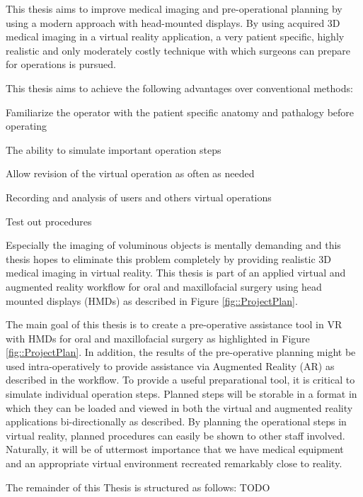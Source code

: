 This thesis aims to improve medical imaging and pre-operational planning by using a modern approach with head-mounted displays.
By using acquired 3D medical imaging in a virtual reality application, a very patient specific, highly realistic and only moderately costly technique with which surgeons can prepare for operations is pursued.

This thesis aims to achieve the following advantages over conventional methods:
\begin{compactenum}[label=(\alph*)]
    \item Familiarize the operator with the patient specific anatomy and pathalogy before operating
    \item The ability to simulate important operation steps
    \item Allow revision of the virtual operation as often as needed
    \item Recording and analysis of users and others virtual operations
    \item Test out procedures
\end{compactenum}

Especially the imaging of voluminous objects is mentally demanding and this thesis hopes to eliminate this problem completely by providing realistic 3D medical imaging in virtual reality.
This thesis is part of an applied virtual and augmented reality workflow for oral and maxillofacial surgery using head mounted displays (HMDs) as described in Figure \ref{fig::ProjectPlan}.

The main goal of this thesis is to create a pre-operative assistance tool in VR with HMDs for oral and maxillofacial surgery as highlighted in Figure \ref{fig::ProjectPlan}. 
In addition, the results of the pre-operative planning might be used intra-operatively to provide assistance via Augmented Reality (AR) as described in the workflow.
To provide a useful preparational tool, it is critical to simulate individual operation steps.
Planned steps will be storable in a format in which they can be loaded and viewed in both the virtual and augmented reality applications bi-directionally as described.
By planning the operational steps in virtual reality, planned procedures can easily be shown to other staff involved.
Naturally, it will be of uttermost importance that we have medical equipment and an appropriate virtual environment recreated remarkably close to reality.

The remainder of this Thesis is structured as follows: TODO